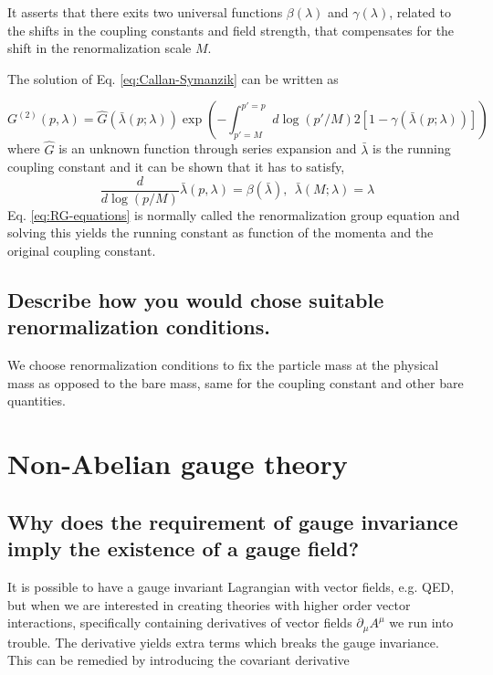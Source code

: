 \documentclass[paper=a4, fontsize=11pt]{scrartcl} %
\numberwithin{equation}{section} %
\numberwithin{figure}{section} %
\numberwithin{table}{section} %
\newcommand{\parentheses}[1]{\ensuremath{\left( #1 \right)}}
\newcommand{\commutator}[1]{\ensuremath{\left[ #1 \right]}}
\begin{document}
It asserts that there exits two universal functions $\beta(\lambda)$ and $\gamma(\lambda)$, related to the shifts in the coupling constants and field strength, that compensates for the shift in the renormalization scale $M$.

The solution of Eq. \eqref{eq:Callan-Symanzik} can be written as

\begin{equation}
G^{(2)}(p,\lambda)= \hat{G}\parentheses{\bar{\lambda}(p;\lambda)} \exp \parentheses{- \int _{p'=M}^{p'=p} d \log (p'/M) 2\commutator{1-\gamma \parentheses{\bar{\lambda}(p;\lambda)}}}
\end{equation}
where $\hat{G}$ is an unknown function through series expansion and $\bar{\lambda}$ is the running coupling constant and it can be shown that it has to satisfy,
\begin{equation}
\frac{d}{d\log(p/M)}\bar{\lambda} (p, \lambda) = \beta (\bar{\lambda}), ~~ \bar{\lambda}(M;\lambda) = \lambda
\label{eq:RG-equations}
\end{equation}
Eq. \eqref{eq:RG-equations} is normally called the renormalization group equation and solving this yields the running constant as function of the momenta and the original coupling constant.

\subsection{Describe how you would chose suitable renormalization conditions.}
We choose renormalization conditions to fix the particle mass at the physical mass as opposed to the bare mass, same for the coupling constant and other bare quantities.

\section{Non-Abelian gauge theory}

\subsection{Why does the requirement of gauge invariance imply the existence of a gauge field?}
It is possible to have a gauge invariant Lagrangian with vector fields, e.g. QED, but when we are interested in creating theories with higher order vector interactions, specifically containing derivatives of vector fields $\partial_{\mu}A^{\mu}$ we run into trouble. The derivative yields extra terms which breaks the gauge invariance. This can be remedied by introducing the covariant derivative
\end{document}
